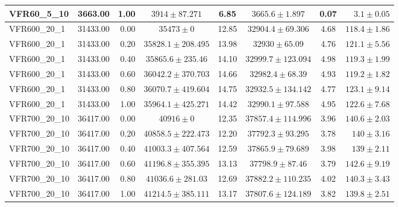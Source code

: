 \begin{longtable}{lrrccccr}
  VFR60\_5\_10 & 3663.00 & 1.00 & $3914 \pm 87.271$ & 6.85 & $3665.6 \pm 1.897$ & 0.07 & $3.1 \pm 0.05$ \\ 
   \midrule
VFR600\_20\_1 & 31433.00 & 0.00 & $35473 \pm 0$ & 12.85 & $32904.4 \pm 69.306$ & 4.68 & $118.4 \pm 1.86$ \\ 
  VFR600\_20\_1 & 31433.00 & 0.20 & $35828.1 \pm 208.495$ & 13.98 & $32930 \pm 65.09$ & 4.76 & $121.1 \pm 5.56$ \\ 
  VFR600\_20\_1 & 31433.00 & 0.40 & $35865.6 \pm 235.46$ & 14.10 & $32999.7 \pm 123.094$ & 4.98 & $119.3 \pm 1.99$ \\ 
  VFR600\_20\_1 & 31433.00 & 0.60 & $36042.2 \pm 370.703$ & 14.66 & $32982.4 \pm 68.39$ & 4.93 & $119.2 \pm 1.82$ \\ 
  VFR600\_20\_1 & 31433.00 & 0.80 & $36070.7 \pm 419.604$ & 14.75 & $32932.5 \pm 134.142$ & 4.77 & $123.1 \pm 9.14$ \\ 
  VFR600\_20\_1 & 31433.00 & 1.00 & $35964.1 \pm 425.271$ & 14.42 & $32990.1 \pm 97.588$ & 4.95 & $122.6 \pm 7.68$ \\ 
   \midrule
VFR700\_20\_10 & 36417.00 & 0.00 & $40916 \pm 0$ & 12.35 & $37857.4 \pm 114.996$ & 3.96 & $140.6 \pm 2.03$ \\ 
  VFR700\_20\_10 & 36417.00 & 0.20 & $40858.5 \pm 222.473$ & 12.20 & $37792.3 \pm 93.295$ & 3.78 & $140 \pm 3.16$ \\ 
  VFR700\_20\_10 & 36417.00 & 0.40 & $41003.3 \pm 407.564$ & 12.59 & $37865.9 \pm 79.689$ & 3.98 & $139 \pm 2.11$ \\ 
  VFR700\_20\_10 & 36417.00 & 0.60 & $41196.8 \pm 355.395$ & 13.13 & $37798.9 \pm 87.46$ & 3.79 & $142.6 \pm 9.19$ \\ 
  VFR700\_20\_10 & 36417.00 & 0.80 & $41036.6 \pm 281.03$ & 12.69 & $37882.2 \pm 110.235$ & 4.02 & $140.3 \pm 3.43$ \\ 
  VFR700\_20\_10 & 36417.00 & 1.00 & $41214.5 \pm 385.111$ & 13.17 & $37807.6 \pm 124.189$ & 3.82 & $139.8 \pm 2.51$ \\ 




 
\end{longtable}

